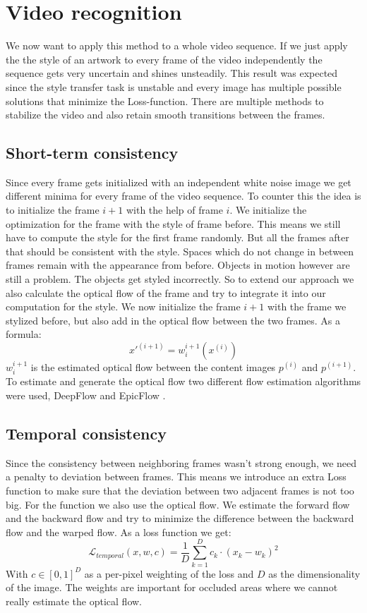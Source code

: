 \documentclass[acmtog, authorversion]{acmart}
\begin{document}
\section{Video recognition}
We now want to apply this method to a whole video sequence. If we just apply the the style of an artwork to every frame of the video independently the sequence gets very uncertain and shines unsteadily. This result was expected since the style transfer task is unstable and every image has multiple possible solutions that minimize the Loss-function. There are multiple methods to stabilize the video and also retain smooth transitions between the frames. 
\subsection{Short-term consistency}
Since every frame gets initialized with an independent white noise image we get different minima for every frame of the video sequence. To counter this the idea is to initialize the frame $i+1$ with the help of frame $i$. We initialize the optimization for the frame with the style of frame before. This means we still have to compute the style for the first frame randomly. But all the frames after that should be consistent with the style. Spaces which do not change in between frames remain with the appearance from before. Objects in motion however are still a problem. The objects get styled incorrectly. So to extend our approach we also calculate the optical flow of the frame and try to integrate it into our computation for the style. We now initialize the frame $i+1$ with the frame we stylized before, but also add in the optical flow between the two frames. As a formula: $$x'^{(i+1)} = w_i^{i+1}(x^{(i)})$$ $w_i^{i+1}$ is the estimated optical flow between the content images $p^{(i)}$ and $ p^{(i+1)}$. 
To estimate and generate the optical flow two different flow estimation algorithms were used, DeepFlow and EpicFlow \citep{Paper2}. 
\subsection{Temporal consistency}
Since the consistency between neighboring frames wasn't strong enough, we need a penalty to deviation between frames. This means we introduce an extra Loss function to make sure that the deviation between two adjacent frames is not too big. For the function we also use the optical flow. We estimate the forward flow and the backward flow and try to minimize the difference between the backward flow and the warped flow. As a loss function we get: $$\mathcal{L}_{temporal}(x,w,c) = \frac{1}{D} \sum_{k=1}^D c_k \cdot (x_k - w_k)^2$$ With $c \in [0,1]^D$ as a per-pixel weighting of the loss and $D$ as the dimensionality of the image. The weights are important for occluded areas where we cannot really estimate the optical flow. 
\end{document}
